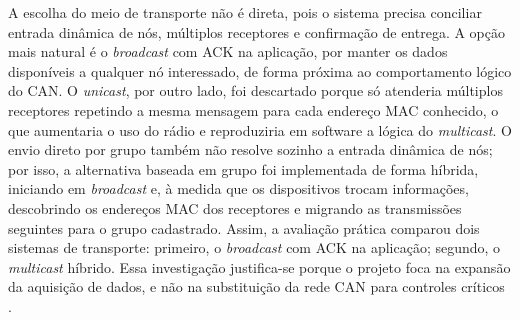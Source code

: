 A escolha do meio de transporte não é direta, pois o sistema precisa conciliar entrada dinâmica de nós, múltiplos receptores e confirmação de entrega. A opção mais natural é o \emph{broadcast} com ACK na aplicação, por manter os dados disponíveis a qualquer nó interessado, de forma próxima ao comportamento lógico do CAN. O \emph{unicast}, por outro lado, foi descartado porque só atenderia múltiplos receptores repetindo a mesma mensagem para cada endereço MAC conhecido, o que aumentaria o uso do rádio e reproduziria em software a lógica do \emph{multicast}. O envio direto por grupo também não resolve sozinho a entrada dinâmica de nós; por isso, a alternativa baseada em grupo foi implementada de forma híbrida, iniciando em \emph{broadcast} e, à medida que os dispositivos trocam informações, descobrindo os endereços MAC dos receptores e migrando as transmissões seguintes para o grupo cadastrado. Assim, a avaliação prática comparou dois sistemas de transporte: primeiro, o \emph{broadcast} com ACK na aplicação; segundo, o \emph{multicast} híbrido. Essa investigação justifica-se porque o projeto foca na expansão da aquisição de dados, e não na substituição da rede CAN para controles críticos \cite{fernandes2022_formula_sae_wifi_can}.